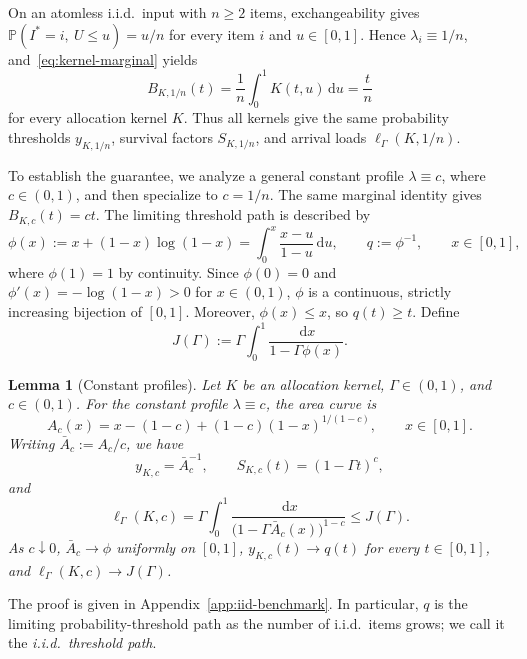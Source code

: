 \documentclass[11pt]{article}
\newtheorem{lemma}[theorem]{Lemma}
\theoremstyle{definition}
\theoremstyle{remark}
\newcommand{\Pp}{\mathbb P}
\newcommand{\dd}{\,\mathrm d}
\begin{document}
On an atomless i.i.d.\ input with $n\ge2$ items, exchangeability gives
$\Pp(I^*=i,\ U\le u)=u/n$ for every item $i$ and $u\in[0,1]$.
Hence $\lambda_i\equiv1/n$, and~\eqref{eq:kernel-marginal} yields
\begin{equation}\label{eq:iid-common-allocation}
 B_{K,1/n}(t)=\frac1n\int_0^1K(t,u)\dd u=\frac tn
\end{equation}
for every allocation kernel $K$.
Thus all kernels give the same probability thresholds $y_{K,1/n}$,
survival factors $S_{K,1/n}$, and arrival loads $\ell_\Gamma(K,1/n)$.

To establish the guarantee, we analyze a general constant profile
$\lambda\equiv c$, where $c\in(0,1)$, and then specialize to $c=1/n$.
The same marginal identity gives $B_{K,c}(t)=ct$.
The limiting threshold path is described by
\begin{equation}\label{eq:iid-clock}
 \phi(x):=x+(1-x)\log(1-x)
         =\int_0^x\frac{x-u}{1-u}\dd u,
 \qquad q:=\phi^{-1},
 \qquad x\in[0,1],
\end{equation}
where $\phi(1)=1$ by continuity.
Since $\phi(0)=0$ and $\phi'(x)=-\log(1-x)>0$ for $x\in(0,1)$,
$\phi$ is a continuous, strictly increasing bijection of $[0,1]$.
Moreover, $\phi(x)\le x$, so $q(t)\ge t$.
Define
\begin{equation}\label{eq:iid-load}
 J(\Gamma):=\Gamma\int_0^1\frac{\dd x}{1-\Gamma\phi(x)}.
\end{equation}

\begin{lemma}[Constant profiles]\label{lem:iid-kernel-blind}
Let $K$ be an allocation kernel, $\Gamma\in(0,1)$, and $c\in(0,1)$.
For the constant profile $\lambda\equiv c$, the area curve is
\begin{equation}\label{eq:constant-profile-area}
 A_c(x)=x-(1-c)+(1-c)(1-x)^{1/(1-c)},
 \qquad x\in[0,1].
\end{equation}
Writing $\bar A_c:=A_c/c$, we have
\[
 y_{K,c}=\bar A_c^{-1},
 \qquad S_{K,c}(t)=(1-\Gamma t)^c,
\]
and
\begin{equation}\label{eq:finite-iid-load}
 \ell_\Gamma(K,c)
 =\Gamma\int_0^1
   \frac{\dd x}{\bigl(1-\Gamma\bar A_c(x)\bigr)^{1-c}}
 \le J(\Gamma).
\end{equation}
As $c\downarrow0$, $\bar A_c\to\phi$ uniformly on $[0,1]$,
$y_{K,c}(t)\to q(t)$ for every $t\in[0,1]$, and
$\ell_\Gamma(K,c)\to J(\Gamma)$.
\end{lemma}

The proof is given in Appendix~\ref{app:iid-benchmark}.
In particular, $q$ is the limiting probability-threshold path as the
number of i.i.d.\ items grows; we call it the \emph{i.i.d.\ threshold path}.
\end{document}
